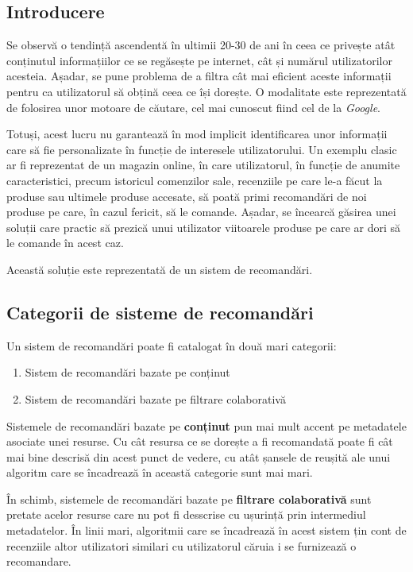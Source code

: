 \documentclass[12pt,a4paper]{report}
\begin{document}
\subsection{Introducere}

Se observă o tendință ascendentă în ultimii 20-30 de ani în ceea ce privește atât conținutul informațiilor ce se regăsește pe internet, cât și numărul utilizatorilor acesteia. \cite{28} Așadar, se pune problema de a filtra cât mai eficient aceste informații pentru ca utilizatorul să obțină ceea ce își dorește. O modalitate este reprezentată de folosirea unor motoare de căutare, cel mai cunoscut fiind cel de la \emph{Google}. \cite{5}

Totuși, acest lucru nu garantează în mod implicit identificarea unor informații care să fie personalizate în funcție de interesele utilizatorului. Un exemplu clasic ar fi reprezentat de un magazin online, în care utilizatorul, în funcție de anumite caracteristici, precum istoricul comenzilor sale, recenziile pe care le-a făcut la produse sau ultimele produse accesate, să poată primi recomandări de noi produse pe care, în cazul fericit, să le comande. Așadar, se încearcă găsirea unei soluții care practic să prezică unui utilizator viitoarele produse pe care ar dori să le comande în acest caz.

Această soluție este reprezentată de un sistem de recomandări.

\subsection{Categorii de sisteme de recomandări}

Un sistem de recomandări poate fi catalogat în două mari categorii:

\begin{enumerate}
  \item Sistem de recomandări bazate pe conținut
  \item Sistem de recomandări bazate pe filtrare colaborativă
\end{enumerate}

Sistemele de recomandări bazate pe \textbf{conținut} pun mai mult accent pe metadatele asociate unei resurse. Cu cât resursa ce se dorește a fi recomandată poate fi cât mai bine descrisă din acest punct de vedere, cu atât șansele de reușită ale unui algoritm care se încadrează în această categorie sunt mai mari. 

În schimb, sistemele de recomandări bazate pe \textbf{filtrare colaborativă} sunt pretate acelor resurse care nu pot fi desscrise cu ușurință prin intermediul metadatelor. În linii mari, algoritmii care se încadrează în acest sistem țin cont de recenziile altor utilizatori similari cu utilizatorul căruia i se furnizează o recomandare.
\end{document}
